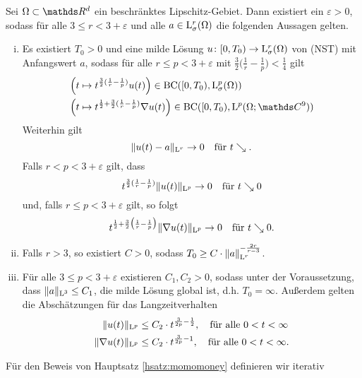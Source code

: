 \begin{hsatz}
  \label{hsatz:momomoney}
  Sei $\Omega \subset \R^d$ ein beschränktes Lipschitz-Gebiet.
  Dann existiert ein $\varepsilon > 0$, sodass für alle $3 \leq r < 3 + \varepsilon$ und alle $a \in \mathrm{L}_\sigma^r(\Omega)$ die folgenden Aussagen gelten.
  \begin{enumerate}[i)]
    \item Es existiert $T_0 > 0$ und eine milde Lösung $u \colon [0,T_0) \to \mathrm{L}_\sigma^r(\Omega)$ von (NST) mit Anfangswert $a$, sodass für alle $r \leq p < 3 + \varepsilon$ mit $\frac{3}{2} \big( \frac{1}{r} - \frac{1}{p} \big) < \frac{1}{4}$ gilt
      \begin{align*}
        &\Big( t \mapsto t^{\frac{3}{2}(\frac{1}{r} - \frac{1}{p})} u(t) \Big) \in \mathrm{BC}([0,T_0), \Ell^p_\sigma(\Omega)) \\
        &\Big( t \mapsto t^{\frac{1}{2} + \frac{3}{2}(\frac{1}{r} - \frac{1}{p})} \nabla u(t) \Big) \in \mathrm{BC}([0,T_0), \Ell^p(\Omega; \C^9) )
      \end{align*}
      Weiterhin gilt
      $$
      \|u(t) - a \|_{\mathrm{L}^r} \to 0 \quad\text{für } t \searrow.
      $$
      Falls $r < p < 3 + \varepsilon$ gilt, dass 
      $$
      t^{\frac{3}{2}(\frac{1}{r} - \frac{1}{p})} \|u(t)\|_{\mathrm{L}^p} \to 0 \quad\text{für } t \searrow 0
      $$
      und, falls $r \leq p < 3 + \varepsilon$ gilt, so folgt
      $$
      t^{\frac{1}{2} + \frac{3}{2}\big( \frac{1}{r} - \frac{1}{p} \big)} \|\nabla u (t) \|_{\mathrm{L}^p} \to 0 \quad\text{für } t \searrow 0.
      $$

    \item Falls $r > 3$, so existiert $C > 0$, sodass $T_0 \geq C \cdot \|a\|_{\mathrm{L}^r}^{-\frac{2r}{r - 3}}$.
    \item Für alle $3 \leq p < 3 + \varepsilon$ existieren $C_1, C_2 > 0$, sodass unter der Voraussetzung, dass $\|a\|_{\mathrm{L}^3} \leq C_1$, die milde Lösung global ist, d.h. $T_0 = \infty$.
      Außerdem gelten die Abschätzungen für das Langzeitverhalten
      \begin{align*}
        \|u(t)\|_{\mathrm{L}^p} &\leq C_2 \cdot t^{\frac{3}{2p} - \frac{1}{2}}, \quad\text{für alle } 0 < t < \infty \\
        \|\nabla u(t) \|_{\mathrm{L}^p} &\leq C_2 \cdot t^{\frac{3}{2p} - 1}, \quad\text{für alle } 0 < t < \infty.
      \end{align*}
  \end{enumerate}
\end{hsatz}
Für den Beweis von Hauptsatz \ref{hsatz:momomoney} definieren wir iterativ
